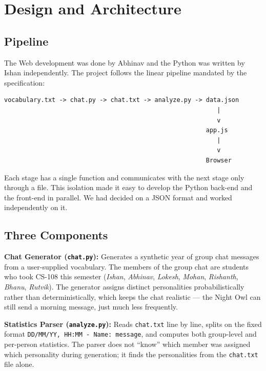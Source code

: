 \documentclass[12pt]{article}
\begin{document}
\section{Design and Architecture}

\subsection{Pipeline}

The Web development was done by Abhinav and the Python was written by Ishan independently.
The project follows the linear pipeline mandated by the specification:

\begin{verbatim}
vocabulary.txt -> chat.py -> chat.txt -> analyze.py -> data.json
                                                          |
                                                          v
                                                       app.js
                                                          |
                                                          v
                                                       Browser
\end{verbatim}

Each stage has a single function and communicates with the next stage
only through a file. This isolation made it easy to develop the Python back-end and the
front-end in parallel. We had decided on a JSON format and worked independently on it.

\subsection{Three Components}

\textbf{Chat Generator (\texttt{chat.py}):} Generates a synthetic year of group
chat messages from a user-supplied vocabulary. The members of the group chat are students who took CS-108 this
semester (\textit{Ishan}, \textit{Abhinav}, \textit{Lokesh}, \textit{Mohan},
\textit{Rishanth}, \textit{Bhanu}, \textit{Rutvik}). The generator assigns
distinct personalities probabilistically rather than deterministically, which
keeps the chat realistic --- the Night Owl can still send a morning message,
just much less frequently.

\textbf{Statistics Parser (\texttt{analyze.py}):} Reads \texttt{chat.txt} line
by line, splits on the fixed format \texttt{DD/MM/YY, HH:MM - Name: message},
and computes both group-level and per-person statistics. The parser does not
``know'' which member was assigned which personality during generation; it
finds the personalities from the \texttt{chat.txt} file alone.
\end{document}
